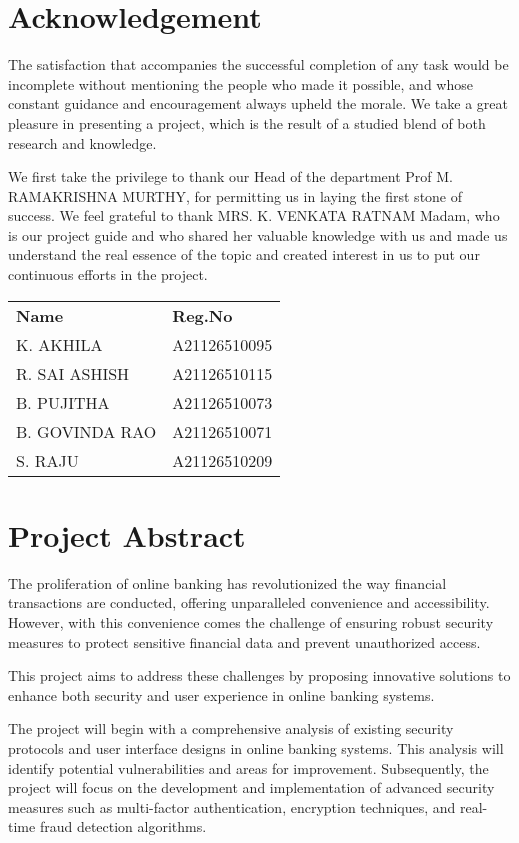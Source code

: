\documentclass{report}
\begin{document}
\chapter*{Acknowledgement}
The satisfaction that accompanies the successful completion of any task would be
incomplete without mentioning the people who made it possible, and whose constant
guidance and encouragement always upheld the morale. We take a great pleasure in
presenting a project, which is the result of a studied blend of both research and
knowledge.

We first take the privilege to thank our Head of the department Prof M.
RAMAKRISHNA MURTHY, for permitting us in laying the first stone of success.
We feel grateful to thank MRS. K. VENKATA RATNAM Madam, who is our project
guide and who shared her valuable knowledge with us and made us understand the
real essence of the topic and created interest in us to put our continuous efforts in the
project.

\vspace{1cm}
\noindent\begin{tabular}{ll}
\textbf{Name} & \textbf{Reg.No} \\
K. AKHILA & A21126510095 \\
R. SAI ASHISH & A21126510115 \\
B. PUJITHA & A21126510073 \\
B. GOVINDA RAO & A21126510071 \\
S. RAJU & A21126510209
\end{tabular}

\tableofcontents

\chapter{Project Abstract}
The proliferation of online banking has revolutionized the way financial transactions are
conducted, offering unparalleled convenience and accessibility. However, with this
convenience comes the challenge of ensuring robust security measures to protect sensitive
financial data and prevent unauthorized access.

This project aims to address these challenges by proposing innovative solutions to enhance
both security and user experience in online banking systems.

The project will begin with a comprehensive analysis of existing security protocols and user
interface designs in online banking systems. This analysis will identify potential
vulnerabilities and areas for improvement. Subsequently, the project will focus on the
development and implementation of advanced security measures such as multi-factor
authentication, encryption techniques, and real-time fraud detection algorithms.
\end{document}
